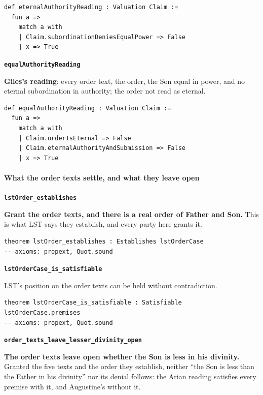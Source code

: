 \documentclass[11pt,paper=\testimonypaper,DIV=13,parskip=false]{scrartcl}
\begin{document}
{\small\begin{verbatim}
def eternalAuthorityReading : Valuation Claim :=
  fun a =>
    match a with
    | Claim.subordinationDeniesEqualPower => False
    | x => True
\end{verbatim}}
\par\medskip\noindent\textbf{\texttt{equal\allowbreak{}Authority\allowbreak{}Reading}}\par\nobreak\noindent
\textbf{Giles’s reading}: every order text, the order, the Son equal in power, and no eternal subordination in authority; the order not read as eternal.

{\small\begin{verbatim}
def equalAuthorityReading : Valuation Claim :=
  fun a =>
    match a with
    | Claim.orderIsEternal => False
    | Claim.eternalAuthorityAndSubmission => False
    | x => True
\end{verbatim}}
\paragraph*{What the order texts settle, and what they leave open}
\leavevmode\par\nobreak
\par\medskip\noindent\textbf{\texttt{lst\allowbreak{}Order\_\allowbreak{}establishes}}\par\nobreak\noindent
\textbf{Grant the order texts, and there is a real order of Father and Son.} This is what LST says they establish, and every party here grants it.

{\small\begin{verbatim}
theorem lstOrder_establishes : Establishes lstOrderCase
-- axioms: propext, Quot.sound
\end{verbatim}}
\par\medskip\noindent\textbf{\texttt{lst\allowbreak{}Order\allowbreak{}Case\_\allowbreak{}is\_\allowbreak{}satisfiable}}\par\nobreak\noindent
LST’s position on the order texts can be held without contradiction.

{\small\begin{verbatim}
theorem lstOrderCase_is_satisfiable : Satisfiable lstOrderCase.premises
-- axioms: propext, Quot.sound
\end{verbatim}}
\par\medskip\noindent\textbf{\texttt{order\_\allowbreak{}texts\_\allowbreak{}leave\_\allowbreak{}lesser\_\allowbreak{}divinity\_\allowbreak{}open}}\par\nobreak\noindent
\textbf{The order texts leave open whether the Son is less in his divinity.} Granted the five texts and the order they establish, neither “the Son is less than the Father in his divinity” nor its denial follows: the Arian reading satisfies every premise with it, and Augustine’s without it.
\end{document}
